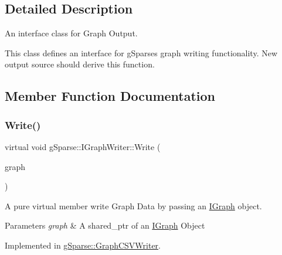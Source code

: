 \subsection{Detailed Description}
An interface class for Graph Output. 

This class defines an interface for g\+Sparse\textquotesingle{}s graph writing functionality. New output source should derive this function. 

\subsection{Member Function Documentation}
\mbox{\label{classg_sparse_1_1_i_graph_writer_a24a0956558888343c5e56a3c39b138af}} 
\subsubsection{\texorpdfstring{Write()}{Write()}\hspace{0.1cm}{\footnotesize\ttfamily [1/3]}}
{\footnotesize\ttfamily virtual void g\+Sparse\+::\+I\+Graph\+Writer\+::\+Write (\begin{DoxyParamCaption}\item[{const g\+Sparse\+::\+Graph \&}]{graph }\end{DoxyParamCaption})\hspace{0.3cm}{\ttfamily [pure virtual]}}



A pure virtual member write Graph Data by passing an \mbox{\hyperlink{classg_sparse_1_1_i_graph}{I\+Graph}} object. 


\begin{DoxyParams}{Parameters}
{\em graph} & A shared\+\_\+ptr of an \mbox{\hyperlink{classg_sparse_1_1_i_graph}{I\+Graph}} Object \\
\hline
\end{DoxyParams}


Implemented in \mbox{\hyperlink{classg_sparse_1_1_graph_c_s_v_writer_a588c4bf47ee70bb72079ac7d6f843c2d}{g\+Sparse\+::\+Graph\+C\+S\+V\+Writer}}.

\mbox{\label{classg_sparse_1_1_i_graph_writer_aa778df52e1595439d724fc873a8dfb52}} 
